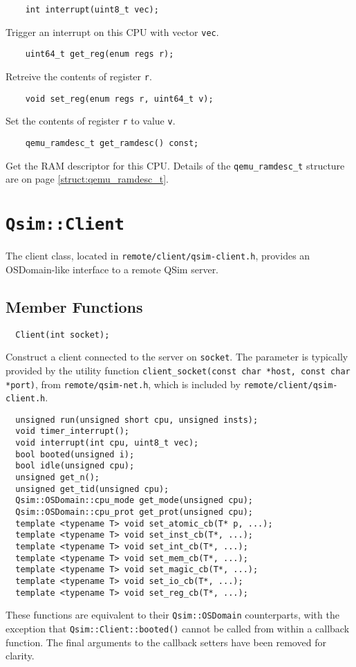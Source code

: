 \documentclass[letterpaper, 10pt]{book}
\begin{document}
\begin{verbatim}
    int interrupt(uint8_t vec);
\end{verbatim}
Trigger an interrupt on this CPU with vector \texttt{vec}.

\begin{verbatim}
    uint64_t get_reg(enum regs r);
\end{verbatim}
Retreive the contents of register \texttt{r}.

\begin{verbatim}
    void set_reg(enum regs r, uint64_t v);
\end{verbatim}
Set the contents of register \texttt{r} to value \texttt{v}.

\begin{verbatim}
    qemu_ramdesc_t get_ramdesc() const;
\end{verbatim}
Get the RAM descriptor for this CPU. Details of the \texttt{qemu\_ramdesc\_t}
structure are on page \ref{struct:qemu_ramdesc_t}.

\newpage

\section{\texttt{Qsim::Client}} \label{class:Client}
The client class, located in \texttt{remote/client/qsim-client.h}, provides an
OSDomain-like interface to a remote QSim server.

\subsection{Member Functions}

\label{func:Client} \begin{verbatim}
  Client(int socket);
\end{verbatim}
Construct a client connected to the server on \texttt{socket}. The parameter is
typically provided by the utility function
\texttt{client\_socket(const char *host, const char *port)}, from
\texttt{remote/qsim-net.h}, which is included by
\texttt{remote/client/qsim-client.h}.

\begin{verbatim}
  unsigned run(unsigned short cpu, unsigned insts);
  void timer_interrupt();
  void interrupt(int cpu, uint8_t vec);
  bool booted(unsigned i);
  bool idle(unsigned cpu);
  unsigned get_n();
  unsigned get_tid(unsigned cpu);
  Qsim::OSDomain::cpu_mode get_mode(unsigned cpu);
  Qsim::OSDomain::cpu_prot get_prot(unsigned cpu);
  template <typename T> void set_atomic_cb(T* p, ...);
  template <typename T> void set_inst_cb(T*, ...);
  template <typename T> void set_int_cb(T*, ...);
  template <typename T> void set_mem_cb(T*, ...);
  template <typename T> void set_magic_cb(T*, ...);
  template <typename T> void set_io_cb(T*, ...);
  template <typename T> void set_reg_cb(T*, ...);

\end{verbatim}
These functions are equivalent to their \texttt{Qsim::OSDomain} counterparts,
with the exception that \texttt{Qsim::Client::booted()} cannot be called from
within a callback function. The final arguments to the callback setters have
been removed for clarity.
\end{document}
